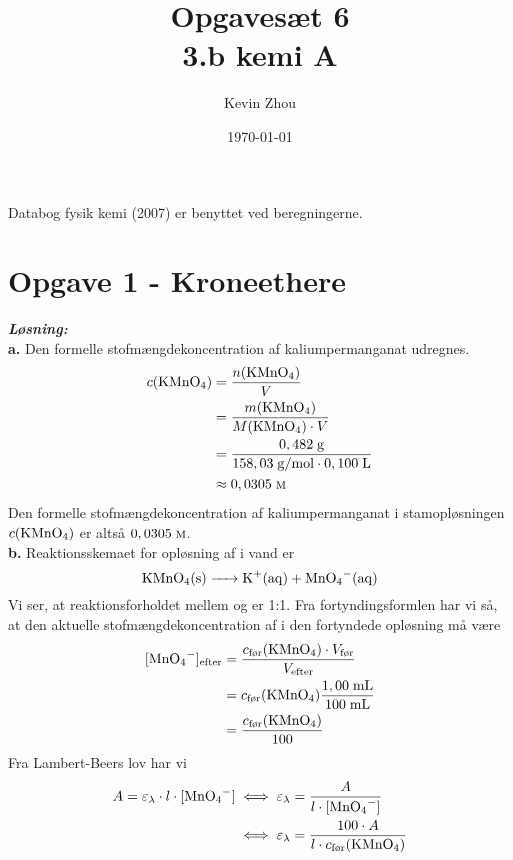 \documentclass{report}
\title{Opgavesæt 6\\
{\Large \textbf{3.b kemi A}}}
\author{Kevin Zhou}
\date{\today}
\newcommand{\sol}{\setlength{\parindent}{0cm}\textbf{\textit{Løsning:}}\setlength{\parindent}{1cm}}
\begin{document}
\maketitle
\begin{note}
  Databog fysik kemi (2007) er benyttet ved beregningerne.
\end{note}
\section*{Opgave 1 - Kroneethere}
\sol \\
\textbf{a.}
Den formelle stofmængdekoncentration af kaliumpermanganat udregnes.
\begin{equation*}
\begin{split}
  c(\ce{KMnO4})&=\frac{n(\ce{KMnO4} )}{V}\\
  &=\frac{m(\ce{KMnO4})}{M(\ce{KMnO4}) \cdot V}\\
  &=\frac{0,482 \;\unit{g} }{158,03 \;\unit{g/mol} \cdot 0,100 \;\unit{L} }\\
  &\approx 0,0305 \;\unit{\textsc{m}} 
\end{split}
\end{equation*}
Den formelle stofmængdekoncentration af kaliumpermanganat i stamopløsningen $c(\ce{KMnO4})$ er altså $0,0305 \;\unit{\textsc{m}} $.\\[1ex]
\textbf{b.}
Reaktionsskemaet for opløsning af  i vand er
\[
\ce{KMnO4(s) -> K+(aq) + MnO4-(aq)} 
\] 
Vi ser, at reaktionsforholdet mellem  og  er 1:1. 
Fra fortyndingsformlen har vi så, at den aktuelle stofmængdekoncentration af  i den fortyndede opløsning må være
\begin{equation*}
\begin{split}
  [\ce{MnO4-} ]_{\text{efter} }&=\frac{c_{\text{før} }(\ce{KMnO4}) \cdot V_{\text{før}    }}{V _{\text{efter} }}\\
  &=c _{\text{før}}(\ce{KMnO4} )\frac{1,00 \;\unit{mL} }{100 \;\unit{mL} }\\
  &=\frac{c_{\text{før} }(\ce{KMnO4}) }{100}
\end{split}
\end{equation*}
Fra Lambert-Beers lov har vi 
\begin{equation*}
\begin{split}
  A=\varepsilon_{\lambda } \cdot l \cdot [\ce{MnO4-}] &\iff \varepsilon_{\lambda } = \frac{A}{l \cdot [\ce{MnO4-} ]}\\
  &\iff \varepsilon_{\lambda }=\frac{100 \cdot A}{l \cdot c_{\text{før} }(\ce{KMnO4})}
\end{split}
\end{equation*}
\end{document}
